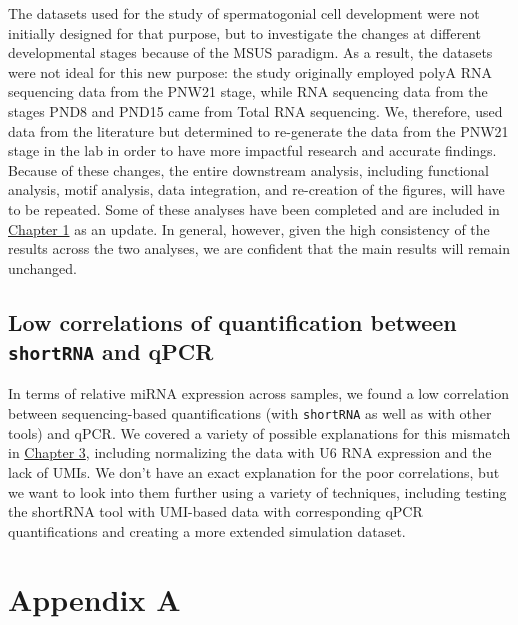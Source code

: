 \documentclass[12pt,twoside]{reedthesis}
\begin{document}
The datasets used for the study of spermatogonial cell development were not initially designed for that purpose, but to investigate the changes at different developmental stages because of the MSUS paradigm. As a result, the datasets were not ideal for this new purpose: the study originally employed polyA RNA sequencing data from the PNW21 stage, while RNA sequencing data from the stages PND8 and PND15 came from Total RNA sequencing. We, therefore, used data from the literature but determined to re-generate the data from the PNW21 stage in the lab in order to have more impactful research and accurate findings. Because of these changes, the entire downstream analysis, including functional analysis, motif analysis, data integration, and re-creation of the figures, will have to be repeated. Some of these analyses have been completed and are included in \protect\hyperlink{chapter1}{Chapter 1} as an update. In general, however, given the high consistency of the results across the two analyses, we are confident that the main results will remain unchanged.

\hypertarget{low-correlations-of-quantification-between-shortrna-and-qpcr}{%
\section*{\texorpdfstring{Low correlations of quantification between \texttt{shortRNA} and qPCR}{Low correlations of quantification between shortRNA and qPCR}}\label{low-correlations-of-quantification-between-shortrna-and-qpcr}}

In terms of relative miRNA expression across samples, we found a low correlation between sequencing-based quantifications (with \texttt{shortRNA} as well as with other tools) and qPCR. We covered a variety of possible explanations for this mismatch in \protect\hyperlink{chapter3}{Chapter 3}, including normalizing the data with U6 RNA expression and the lack of UMIs. We don't have an exact explanation for the poor correlations, but we want to look into them further using a variety of techniques, including testing the shortRNA tool with UMI-based data with corresponding qPCR quantifications and creating a more extended simulation dataset.

\hypertarget{aa}{%
\chapter*{Appendix A}\label{aa}}
\end{document}

